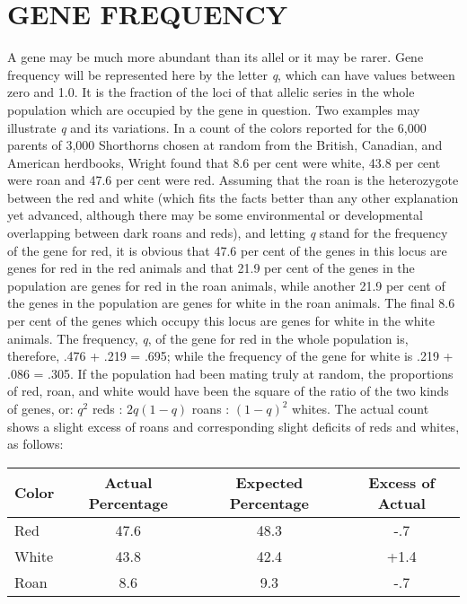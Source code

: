\section*{GENE FREQUENCY}

A gene may be much more abundant than its allel or it may be
rarer. Gene frequency will be represented here by the letter \textit{q}, which
can have values between zero and 1.0. It is the fraction of the loci of
that allelic series in the whole population which are occupied by the
gene in question. Two examples may illustrate \textit{q} and its variations.
In a count of the colors reported for the 6,000 parents of 3,000 Shorthorns
chosen at random from the British, Canadian, and American herdbooks, Wright
found that 8.6 per cent were white, 43.8 per cent were roan and 47.6 per cent
were red. Assuming that the roan is the heterozygote between the red and white
(which fits the facts better than any other explanation yet advanced, although
there may be some environmental or developmental overlapping between dark roans
and reds), and letting \textit{q} stand for the frequency of the gene for red,
it is obvious that 47.6 per cent of the genes in this locus are genes for red
in the red animals and that 21.9 per cent of the genes in the population are
genes for red in the roan animals, while another 21.9 per cent of the genes in
the population are genes for white in the roan animals. The final 8.6
per cent of the genes which occupy this locus are genes for white in the
white animals. The frequency, \textit{q}, of the gene for red in the whole
population is, therefore, .476 + .219 = .695; while the frequency of the gene
for white is .219 + .086 = .305. If the population had been mating
truly at random, the proportions of red, roan, and white would have
been the square of the ratio of the two kinds of genes, or: $q^2$ reds :
$2q (1 - q)$ roans : $(1 - q)^2$ whites. The actual count shows a slight
excess of roans and corresponding slight deficits of reds and whites, as
follows:

\begin{table}[htbp]
	\begin{tabular}{lccc}
		\hline
		\hline
 		Color	& Actual Percentage	& Expected Percentage	& Excess of Actual \\
 		\hline
		Red		& 47.6				& 48.3					& -.7 \\
		White	& 43.8				& 42.4					& +1.4 \\
		Roan	& 8.6				& 9.3					& -.7 \\
		\hline
	\end{tabular}
\end{table}

